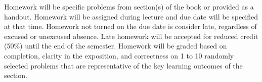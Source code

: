 Homework will be specific  problems from section(s) of the book or provided as a handout.  Homework will be assigned during lecture and due date will be specified at that time.    Homework not turned on the due date is consider late, regardless of excused or unexcused absence.  Late homework will be accepted for reduced credit (50\%) until the end of the semester.    Homework will be graded based on completion, clarity in the exposition, and correctness on 1 to 10 randomly selected problems that are representative of the key learning outcomes of  the section.  
 
